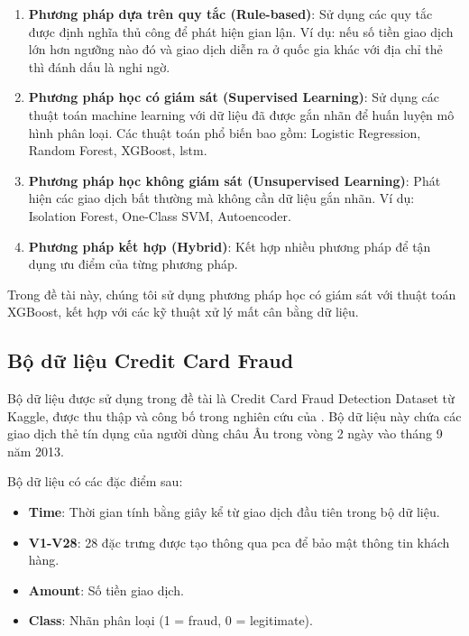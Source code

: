 \begin{enumerate}
    \item \textbf{Phương pháp dựa trên quy tắc (Rule-based)}: Sử dụng các quy tắc được định nghĩa thủ công để phát hiện gian lận. Ví dụ: nếu số tiền giao dịch lớn hơn ngưỡng nào đó và giao dịch diễn ra ở quốc gia khác với địa chỉ thẻ thì đánh dấu là nghi ngờ.
    
    \item \textbf{Phương pháp học có giám sát (Supervised Learning)}: Sử dụng các thuật toán machine learning với dữ liệu đã được gắn nhãn để huấn luyện mô hình phân loại. Các thuật toán phổ biến bao gồm: Logistic Regression, Random Forest, XGBoost, \ac{lstm}.
    
    \item \textbf{Phương pháp học không giám sát (Unsupervised Learning)}: Phát hiện các giao dịch bất thường mà không cần dữ liệu gắn nhãn. Ví dụ: Isolation Forest, One-Class SVM, Autoencoder.
    
    \item \textbf{Phương pháp kết hợp (Hybrid)}: Kết hợp nhiều phương pháp để tận dụng ưu điểm của từng phương pháp.
\end{enumerate}

Trong đề tài này, chúng tôi sử dụng phương pháp học có giám sát với thuật toán XGBoost, kết hợp với các kỹ thuật xử lý mất cân bằng dữ liệu.

\subsection{Bộ dữ liệu Credit Card Fraud}

Bộ dữ liệu được sử dụng trong đề tài là Credit Card Fraud Detection Dataset từ Kaggle, được thu thập và công bố trong nghiên cứu của \cite{creditcard_dataset}. Bộ dữ liệu này chứa các giao dịch thẻ tín dụng của người dùng châu Âu trong vòng 2 ngày vào tháng 9 năm 2013.

Bộ dữ liệu có các đặc điểm sau:
\begin{itemize}
    \item \textbf{Time}: Thời gian tính bằng giây kể từ giao dịch đầu tiên trong bộ dữ liệu.
    \item \textbf{V1-V28}: 28 đặc trưng được tạo thông qua \ac{pca} để bảo mật thông tin khách hàng.
    \item \textbf{Amount}: Số tiền giao dịch.
    \item \textbf{Class}: Nhãn phân loại (1 = fraud, 0 = legitimate).
\end{itemize}

